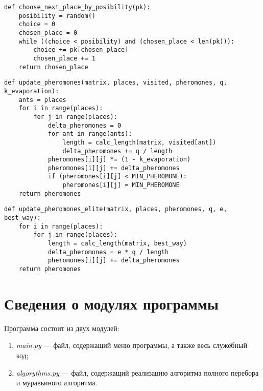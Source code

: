 \begin{center}
    \captionsetup{justification=raggedright,singlelinecheck=off}
    \begin{lstlisting}[label=lst:choose_next,caption=Алгоритм нахождения следующего города на основании рандома]
def choose_next_place_by_posibility(pk):
	posibility = random()
	choice = 0
	chosen_place = 0
	while ((choice < posibility) and (chosen_place < len(pk))):
		choice += pk[chosen_place]
		chosen_place += 1
	return chosen_place
\end{lstlisting}
\end{center}

\begin{center}
    \captionsetup{justification=raggedright,singlelinecheck=off}
    \begin{lstlisting}[label=lst:upd_pher,caption=Алгоритм обновления матрицы феромонов для обычных муравьев]
def update_pheromones(matrix, places, visited, pheromones, q, k_evaporation):
	ants = places
	for i in range(places):
		for j in range(places):
			delta_pheromones = 0
			for ant in range(ants):
				length = calc_length(matrix, visited[ant])
				delta_pheromones += q / length
			pheromones[i][j] *= (1 - k_evaporation)
			pheromones[i][j] += delta_pheromones
			if (pheromones[i][j] < MIN_PHEROMONE):
				pheromones[i][j] = MIN_PHEROMONE
	return pheromones
\end{lstlisting}
\end{center}

\begin{center}
	\captionsetup{justification=raggedright,singlelinecheck=off}
	\begin{lstlisting}[label=lst:upd_pher_el,caption=Алгоритм обновления матрицы феромонов для элитных муравьев]
def update_pheromones_elite(matrix, places, pheromones, q, e, best_way):
	for i in range(places):
		for j in range(places):
			length = calc_length(matrix, best_way)
			delta_pheromones = e * q / length
			pheromones[i][j] += delta_pheromones
	return pheromones
	\end{lstlisting}
\end{center}

\section{Сведения о модулях программы}
Программа состоит из двух модулей:
\begin{enumerate}[label=\arabic*)]
	\item \textit{main.py} --- файл, содержащий меню программы, а также весь служебный код;
    \item \textit{algorythms.py} --- файл, содержащий реализацию алгоритма полного перебора и муравьиного алгоритма.
\end{enumerate}


